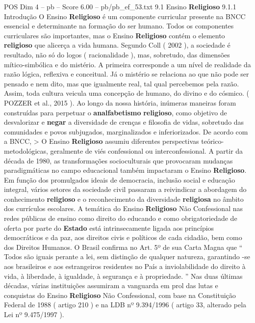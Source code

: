 \begin{textsample}{POS Dim 4 – pb – Score 6.00 – pb/pb\_ef\_53.txt}  \label{ex:f4_pos_270}
9.1 Ensino \textbf{Religioso} 9.1.1 Introdução O Ensino \textbf{Religioso} é um componente curricular presente na BNCC essencial e determinante na formação do ser humano.
Todos os componentes curriculares são importantes, mas o Ensino \textbf{Religioso} contém o elemento \textbf{religioso} que alicerça a vida humana.
Segundo Coll ( 2002 ), a sociedade é resultado, não só do logos ( racionalidade ), mas, sobretudo, das dimensões mítico-simbólica e do mistério.
A primeira corresponde a um nível de realidade da razão lógica, reflexiva e conceitual.
Já o mistério se relaciona ao que não pode ser pensado e nem dito, mas que igualmente real, tal qual percebemos pela razão.
Assim, toda cultura veicula uma concepção de humano, do divino e do cósmico. ( POZZER et al., 2015 ).
Ao longo da nossa história, inúmeras maneiras foram construídas para perpetuar o \textbf{analfabetismo} \textbf{religioso}, como objetivo de desvalorizar e \textbf{negar} a diversidade de crenças e filosofia de vidas, sobretudo das comunidades e povos subjugados, marginalizados e inferiorizados.
De acordo com a BNCC, > O Ensino \textbf{Religioso} assumiu diferentes perspectivas teórico-metodológicas, geralmente de viés confessional ou interconfessional.
A partir da década de 1980, as transformações socioculturais que provocaram mudanças paradigmáticas no campo educacional também impactaram o Ensino \textbf{Religioso}.
Em função dos promulgados ideais de democracia, inclusão social e educação integral, vários setores da sociedade civil passaram a reivindicar a abordagem do conhecimento \textbf{religioso} e o reconhecimento da diversidade \textbf{religiosa} no âmbito dos currículos escolares.
A temática do Ensino \textbf{Religioso} Não Confessional nas redes públicas de ensino como direito do educando e como obrigatoriedade de oferta por parte do \textbf{Estado} está intrinsecamente ligada aos princípios democráticos e da paz, aos direitos civis e políticos de cada cidadão, bem como dos Direitos Humanos.
O Brasil confirma no Art. 5º de sua Carta Magna que “ Todos são iguais perante a lei, sem distinção de qualquer natureza, garantindo -se aos brasileiros e aos estrangeiros residentes no País a inviolabilidade do direito à vida, à liberdade, à igualdade, à segurança e à propriedade. ” Nas duas últimas décadas, várias instituições assumiram a vanguarda em prol das lutas e conquistas do Ensino \textbf{Religioso} Não Confessional, com base na Constituição Federal de 1988 ( artigo 210 ) e na LDB nº 9.394/1996 ( artigo 33, alterado pela Lei nº 9.475/1997 ).

\end{textsample}
